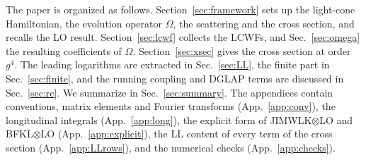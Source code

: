 The paper is organized as follows. Section~\ref{sec:framework} sets up the light-cone Hamiltonian, the evolution operator $\Omega$, the scattering and the cross section, and recalls the LO result. Section~\ref{sec:lcwf} collects the LCWFs, and Sec.~\ref{sec:omega} the resulting coefficients of $\Omega$. Section~\ref{sec:xsec} gives the cross section at order $g^4$. The leading logarithms are extracted in Sec.~\ref{sec:LL}, the finite part in Sec.~\ref{sec:finite}, and the running coupling and DGLAP terms are discussed in Sec.~\ref{sec:rc}. We summarize in Sec.~\ref{sec:summary}. The appendices contain conventions, matrix elements and Fourier transforms (App.~\ref{app:conv}), the longitudinal integrals (App.~\ref{app:long}), the explicit form of JIMWLK$\otimes$LO and BFKL$\otimes$LO (App.~\ref{app:explicit}), the LL content of every term of the cross section (App.~\ref{app:LLrows}), and the numerical checks (App.~\ref{app:checks}).
